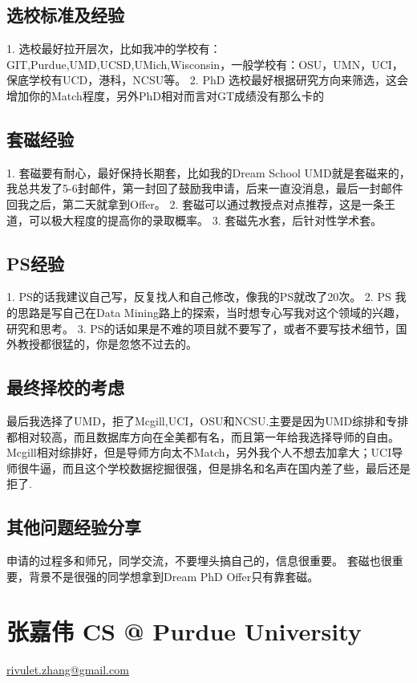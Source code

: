 \documentclass[11pt,fleqn,openany]{book} %
\begin{document}
\subsection*{选校标准及经验}
1. 选校最好拉开层次，比如我冲的学校有：GIT,Purdue,UMD,UCSD,UMich,Wisconsin，一般学校有：OSU，UMN，UCI，保底学校有UCD，港科，NCSU等。
2. PhD 选校最好根据研究方向来筛选，这会增加你的Match程度，另外PhD相对而言对GT成绩没有那么卡的
\subsection*{套磁经验}
1. 套磁要有耐心，最好保持长期套，比如我的Dream School UMD就是套磁来的，我总共发了5-6封邮件，第一封回了鼓励我申请，后来一直没消息，最后一封邮件回我之后，第二天就拿到Offer。
2. 套磁可以通过教授点对点推荐，这是一条王道，可以极大程度的提高你的录取概率。
3. 套磁先水套，后针对性学术套。
\subsection*{PS经验}
1. PS的话我建议自己写，反复找人和自己修改，像我的PS就改了20次。
2. PS 我的思路是写自己在Data Mining路上的探索，当时想专心写我对这个领域的兴趣，研究和思考。
3. PS的话如果是不难的项目就不要写了，或者不要写技术细节，国外教授都很猛的，你是忽悠不过去的。
\subsection*{最终择校的考虑}
最后我选择了UMD，拒了Mcgill,UCI，OSU和NCSU.主要是因为UMD综排和专排都相对较高，而且数据库方向在全美都有名，而且第一年给我选择导师的自由。Mcgill相对综排好，但是导师方向太不Match，另外我个人不想去加拿大；UCI导师很牛逼，而且这个学校数据挖掘很强，但是排名和名声在国内差了些，最后还是拒了.
\subsection*{其他问题经验分享}
申请的过程多和师兄，同学交流，不要埋头搞自己的，信息很重要。
套磁也很重要，背景不是很强的同学想拿到Dream PhD Offer只有靠套磁。
\clearpage
\section{张嘉伟 CS @ Purdue University}
\hfill \href{mailto:rivulet.zhang@gmail.com}{rivulet.zhang@gmail.com}
\end{document}
